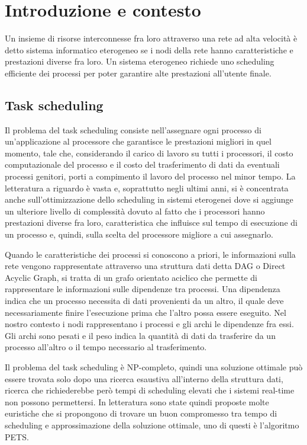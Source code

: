 \chapter{Introduzione e contesto}\label{capitolo1intro}
\vspace{4cm}
Un insieme di risorse interconnesse fra loro attraverso una rete ad alta velocità è detto sistema informatico eterogeneo se i nodi della rete hanno caratteristiche e prestazioni diverse fra loro.
Un sistema eterogeneo richiede uno scheduling efficiente dei processi per poter garantire alte prestazioni all'utente finale.

\section{Task scheduling}
Il problema del task scheduling consiste nell'assegnare ogni processo di un'applicazione al processore che garantisce le prestazioni migliori in quel momento, tale che, considerando il carico di lavoro su tutti i processori, il costo computazionale del processo e il costo del trasferimento di dati da eventuali processi genitori, porti a compimento il lavoro del processo nel minor tempo.
La letteratura a riguardo è vasta e, soprattutto negli ultimi anni, si è concentrata anche sull'ottimizzazione dello scheduling in sistemi eterogenei dove si aggiunge un ulteriore livello di complessità dovuto al fatto che i processori hanno prestazioni diverse fra loro, caratteristica che influisce sul tempo di esecuzione di un processo e, quindi, sulla scelta del processore migliore a cui assegnarlo.

Quando le caratteristiche dei processi si conoscono a priori, le informazioni sulla rete vengono rappresentate attraverso una struttura dati detta DAG o Direct Acyclic Graph, si tratta di un grafo orientato aciclico che permette di rappresentare le informazioni sulle dipendenze tra processi. Una dipendenza indica che un processo necessita di dati provenienti da un altro, il quale deve necessariamente finire l'esecuzione prima che l'altro possa essere eseguito.
Nel nostro contesto i nodi rappresentano i processi e gli archi le dipendenze fra essi. Gli archi sono pesati e il peso indica la quantità di dati da trasferire da un processo all'altro o il tempo necessario al trasferimento.

Il problema del task scheduling è NP-completo\cite{ULLMAN1975384}, quindi una soluzione ottimale può essere trovata solo dopo una ricerca esaustiva all'interno della struttura dati, ricerca che richiederebbe però tempi di scheduling elevati che i sistemi real-time non possono permettersi. 
In letteratura sono state quindi proposte molte euristiche che si propongono di trovare un buon compromesso tra tempo di scheduling e approssimazione della soluzione ottimale, uno di questi è l'algoritmo PETS\cite{ilavarasan2007low}.


